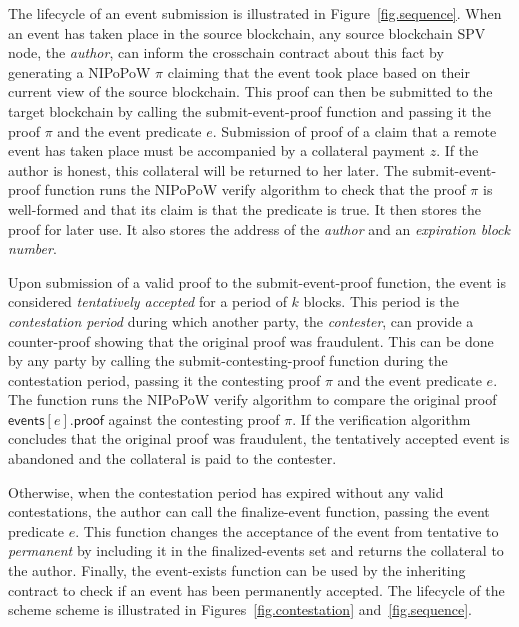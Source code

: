 The lifecycle of an event submission is illustrated in
Figure~\ref{fig.sequence}. When an event has taken place in the source
blockchain, any source blockchain SPV node, the \emph{author}, can inform the
\textsf{crosschain} contract about this fact by generating a NIPoPoW $\pi$
claiming that the event took place based on their current view of the source
blockchain. This proof can then be submitted to the target blockchain by calling
the \textsf{submit-event-proof} function and passing it the proof $\pi$ and the
event predicate $e$. Submission of proof of a claim that a remote event has
taken place must be accompanied by a collateral payment $z$. If the author
is honest, this collateral will be returned to her later. The
\textsf{submit-event-proof} function runs the NIPoPoW \textsf{verify} algorithm
to check that the proof $\pi$ is well-formed and that its claim is that the
predicate is \textsf{true}. It then stores the proof for later use. It also
stores the address of the \emph{author} and an \emph{expiration block number}.

Upon submission of a valid proof to the \textsf{submit-event-proof} function,
the event is considered \emph{tentatively accepted} for a period of $k$ blocks.
This period is the \emph{contestation period} during which another party, the
\emph{contester}, can provide a counter-proof showing that the original proof
was fraudulent. This can be done by any party by calling the
\textsf{submit-contesting-proof} function during the contestation period,
passing it the contesting proof $\pi$ and the event predicate $e$. The function
runs the NIPoPoW \textsf{verify} algorithm to compare the original proof
$\textsf{events}[e].\textsf{proof}$ against the contesting proof $\pi$. If the
verification algorithm concludes that the original proof was fraudulent, the
tentatively accepted event is abandoned and the collateral is paid to the
contester.

Otherwise, when the contestation period has expired without any valid
contestations, the author can call the \textsf{finalize-event} function, passing
the event predicate $e$. This function changes the acceptance of the event from
tentative to \emph{permanent} by including it in the \textsf{finalized-events}
set and returns the collateral to the author. Finally, the \textsf{event-exists}
function can be used by the inheriting contract to check if an event has been
permanently accepted. The lifecycle of the scheme scheme is illustrated in
Figures~\ref{fig.contestation} and~\ref{fig.sequence}.

